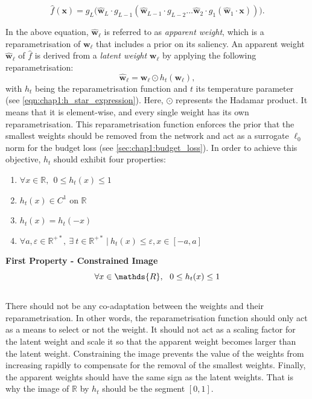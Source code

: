 \begin{equation}
  \label{eqn:chap1:layer_eq_f_hat}
  \hat{f}(\mathbf{x}) = g_L \big(\mathbf{\hat w}_L \cdot g_{L-1}(\mathbf{\hat w}_{L-1} \cdot g_{L-2}
  \dots\mathbf{\hat w}_2 \cdot g_1(\mathbf{\hat w}_1 \cdot \mathbf{x}))\big).
\end{equation}

\noindent In the above equation, $\mathbf{\hat w}_\ell$ is referred to as
\textit{apparent weight}, which is a reparametrisation of $\mathbf{w}_\ell$ that
includes a prior on its saliency. An apparent weight $\mathbf{\hat w}_\ell$ of
$\hat{f}$ is derived from a \emph{latent weight} $\mathbf{w}_\ell$ by applying the
following reparametrisation:
\begin{equation}
  \label{eqn:chap1:reparam}
  \mathbf{\hat w}_\ell = \mathbf{w}_\ell  \odot h_t(\mathbf{w}_\ell),
\end{equation}
\noindent with $h_t$ being the reparametrisation function and $t$ its
temperature parameter (see \cref{eqn:chap1:h_star_expression}). Here, $\odot$
represents the Hadamar product. It means that it is element-wise, and every
single weight has its own reparametrisation. This reparametrisation function
enforces the prior that the smallest weights should be removed from the network
and act as a surrogate $\ell_0$ norm for the budget loss (see
\cref{sec:chap1:budget_loss}). In order to achieve this objective, $h_t$ should
exhibit four properties: \\

\begin{enumerate}
  \item $\forall x \in \mathds{R},~~ 0 \leq h_t(x) \leq 1 $
  \item $h_t(x) \in C^1 \text{ on } \mathds{R}$
  \item $h_t(x) = h_t(-x)$
  \item $\forall a,\varepsilon \in\mathds{R}^{+\ast},~ \exists ~t
          \in\mathds{R}^{+\ast} ~ | ~ h_t(x) \leq \varepsilon, x \in [-a,a]$
\end{enumerate}

\noindent\textbf{First Property - Constrained Image} \\
\begin{equation}
  \centering
  \forall x \in \mathds{R},~~ 0 \leq h_t(x) \leq 1
  \label{eqn:chap1:reparam_prop1}
\end{equation}
\\
There should not be any co-adaptation between the weights and their
reparametrisation. In other words, the reparametrisation function should only
act as a means to select or not the weight. It should not act as a scaling
factor for the latent weight and scale it so that the apparent weight becomes
larger than the latent weight. Constraining the image prevents the value of the
weights from increasing rapidly to compensate for the removal of the smallest
weights. Finally, the apparent weights should have the same sign as the latent
weights. That is why the image of $\mathbb{R}$ by $h_t$ should be the segment
$[0,1]$.\\

